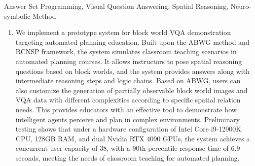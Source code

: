 \begin{englishabstract}{Answer Set Programming, Visual Question Answering, Spatial Reasoning, Neuro-symbolic Method}
\begin{enumerate}[nosep]
\item We implement a prototype system for block world VQA demonstration targeting automated planning education. Built upon the ABWG method and RCNSP framework, the system simulates classroom teaching scenarios in automated planning courses. It allows instructors to pose spatial reasoning questions based on block worlds, and the system provides answers along with intermediate reasoning steps and logic chains. Based on ABWG, users can also customize the generation of partially observable block world images and VQA data with different complexities according to specific spatial relation needs. This provides educators with an effective tool to demonstrate how intelligent agents perceive and plan in complex environments. Preliminary testing shows that under a hardware configuration of Intel Core i9-12900K CPU, 128GB RAM, and dual Nvidia RTX 4090 GPUs, the system achieves a concurrent user capacity of 38, with a 90th percentile response time of 6.9 seconds, meeting the needs of classroom teaching for automated planning.
\end{enumerate}
\end{englishabstract}

\tableofcontents
\listofothers
